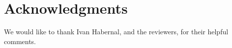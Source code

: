 \documentclass[11pt,a4paper]{article}
\begin{document}
\section*{Acknowledgments}

We would like to thank Ivan Habernal, and the reviewers, for their helpful comments.





































\end{document}
